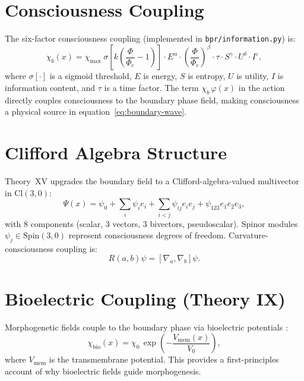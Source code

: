 \documentclass[12pt,oneside]{book}
\theoremstyle{definition}
\begin{document}
\section{Consciousness Coupling}

The six-factor consciousness coupling (implemented in \texttt{bpr/information.py}) is:
\begin{equation}
  \label{eq:chi-b}
  \chi_b(x) = \chi_{\max}\;\sigma\!\left[k\!\left(\frac{\Phi}{\Phi_c}-1\right)\right]
  \cdot E^\alpha \cdot \left(\frac{\Phi}{\Phi_c}\right)^\beta
  \cdot \tau \cdot S^\gamma \cdot U^\delta \cdot I^\varepsilon,
\end{equation}
where $\sigma[\cdot]$ is a sigmoid threshold, $E$ is energy, $S$ is entropy,
$U$ is utility, $I$ is information content, and $\tau$ is a time factor.
The term $\chi_b\,\varphi(x)$ in the action directly couples consciousness to
the boundary phase field, making consciousness a physical source in
equation~\eqref{eq:boundary-wave}.

\section{Clifford Algebra Structure}
\label{sec:clifford}

Theory~XV upgrades the boundary field to a Clifford-algebra-valued multivector in
$\mathrm{Cl}(3,0)$:
\begin{equation}
  \Psi(x) = \psi_0 + \sum_i\psi_i e_i + \sum_{i<j}\psi_{ij}e_ie_j + \psi_{123}e_1e_2e_3,
\end{equation}
with 8 components (scalar, 3 vectors, 3 bivectors, pseudoscalar). Spinor modules
$\psi_j \in \mathrm{Spin}(3,0)$ represent consciousness degrees of freedom.
Curvature-consciousness coupling is:
\begin{equation}
  R(a,b)\psi = [\nabla_a, \nabla_b]\psi.
\end{equation}

\section{Bioelectric Coupling (Theory IX)}

Morphogenetic fields couple to the boundary phase via bioelectric potentials
\citep{Levin2012}:
\begin{equation}
  \chi_{\mathrm{bio}}(x) = \chi_0\,\exp\!\left(-\frac{V_{\mathrm{mem}}(x)}{V_0}\right),
\end{equation}
where $V_{\mathrm{mem}}$ is the transmembrane potential. This provides a
first-principles account of why bioelectric fields guide morphogenesis.
\end{document}
